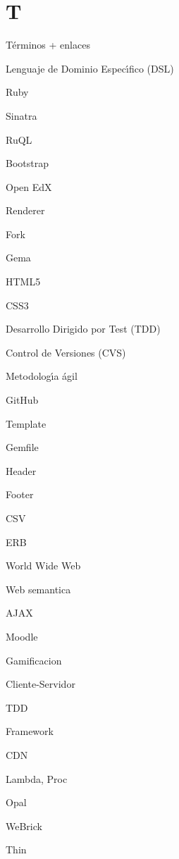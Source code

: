 \section{T}
\label{Apendice1:T}

T\'erminos + enlaces
\bigskip

Lenguaje de Dominio Espec\'{\i}fico (DSL)
\bigskip

Ruby
\bigskip

Sinatra
\bigskip

RuQL
\bigskip

Bootstrap
\bigskip

Open EdX
\bigskip

Renderer
\bigskip

Fork
\bigskip

Gema
\bigskip

HTML5
\bigskip

CSS3
\bigskip

Desarrollo Dirigido por Test (TDD)
\bigskip

Control de Versiones (CVS)
\bigskip

Metodolog\'{\i}a \'agil
\bigskip

GitHub
\bigskip

Template
\bigskip

Gemfile
\bigskip

Header
\bigskip

Footer
\bigskip

CSV
\bigskip

ERB
\bigskip

World Wide Web
\bigskip

Web semantica
\bigskip

AJAX
\bigskip

Moodle
\bigskip

Gamificacion
\bigskip

Cliente-Servidor
\bigskip

TDD
\bigskip

Framework
\bigskip

CDN
\bigskip

Lambda, Proc
\bigskip

Opal
\bigskip

WeBrick
\bigskip

Thin
\bigskip